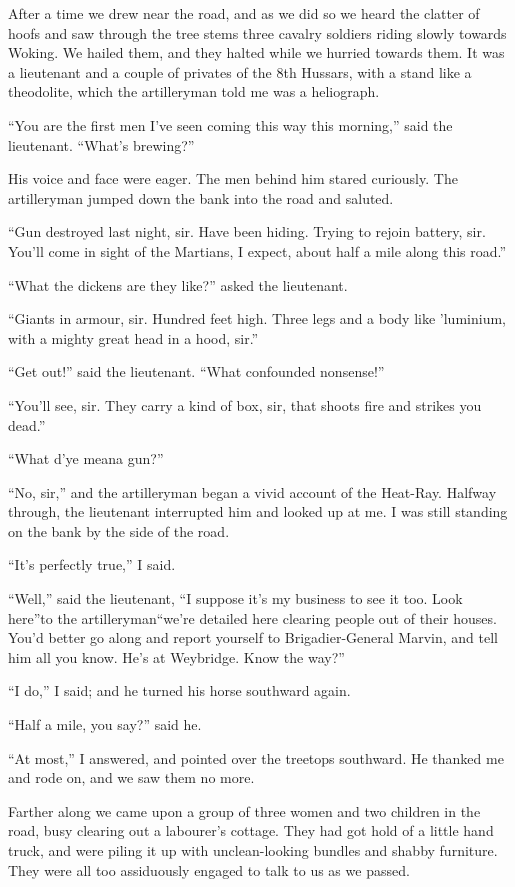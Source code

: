 After a time we drew near the road, and as we did so we heard the
clatter of hoofs and saw through the tree stems three cavalry
soldiers riding slowly towards Woking. We hailed them, and they
halted while we hurried towards them. It was a lieutenant and a
couple of privates of the 8th Hussars, with a stand like a
theodolite, which the artilleryman told me was a heliograph.

``You are the first men I've seen coming this way this morning,''
said the lieutenant. ``What's brewing?''

His voice and face were eager. The men behind him stared curiously.
The artilleryman jumped down the bank into the road and saluted.

``Gun destroyed last night, sir. Have been hiding. Trying to rejoin
battery, sir. You'll come in sight of the Martians, I expect, about
half a mile along this road.''

``What the dickens are they like?'' asked the lieutenant.

``Giants in armour, sir. Hundred feet high. Three legs and a body
like 'luminium, with a mighty great head in a hood, sir.''

``Get out!'' said the lieutenant. ``What confounded nonsense!''

``You'll see, sir. They carry a kind of box, sir, that shoots fire
and strikes you dead.''

``What d'ye mean\dash{}a gun?''

``No, sir,'' and the artilleryman began a vivid account of the
Heat-Ray. Halfway through, the lieutenant interrupted him and
looked up at me. I was still standing on the bank by the side of
the road.

``It's perfectly true,'' I said.

``Well,'' said the lieutenant, ``I suppose it's my business to see it
too. Look here''\dash{}to the artilleryman\dash{}``we're detailed here clearing
people out of their houses. You'd better go along and report
yourself to Brigadier-General Marvin, and tell him all you know.
He's at Weybridge. Know the way?''

``I do,'' I said; and he turned his horse southward again.

``Half a mile, you say?'' said he.

``At most,'' I answered, and pointed over the treetops southward. He
thanked me and rode on, and we saw them no more.

Farther along we came upon a group of three women and two children
in the road, busy clearing out a labourer's cottage. They had got
hold of a little hand truck, and were piling it up with
unclean-looking bundles and shabby furniture. They were all too
assiduously engaged to talk to us as we passed.

